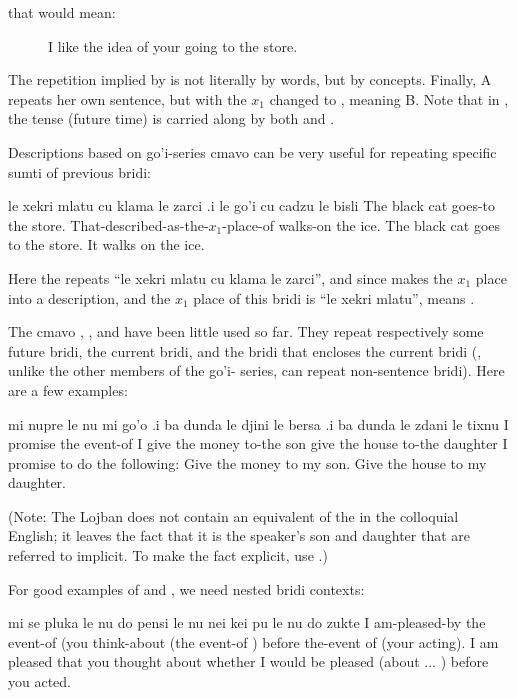 {\noindent}that would mean: 
\begin{description}
\item[] I like the idea of your going to the store.
\end{description}

The repetition implied by  is not literally by words,
    but by concepts. Finally, A repeats her own sentence, but with
    the $x_1$ changed to , meaning B. Note that in , the tense  (future time)
    is carried along by both  and . 

Descriptions based on go'i-series cmavo can be very useful
    for repeating specific sumti of previous bridi:
\begin{example}
le xekri mlatu cu klama le zarci\n
\T	.i le go'i cu\n
\T	cadzu le bisli\n
The black cat goes-to the store.\n
\T	That-described-as-the-$x_1$-place-of \n
\T	walks-on the ice.\n
The black cat goes to the store.  It walks on the ice.
\end{example}

Here the  repeats ``le xekri mlatu cu klama le
    zarci'', and since  makes the $x_1$ place into a
    description, and the $x_1$ place of this bridi is ``le xekri
    mlatu'',  means .

The cmavo , , and  have been little
    used so far. They repeat respectively some future bridi, the
    current bridi, and the bridi that encloses the current bridi
    (, unlike the other members of the go'i- series, can
    repeat non-sentence bridi). Here are a few examples:
\begin{example}
mi nupre le nu mi go'o\n
\T	.i ba dunda le djini le bersa\n
\T	.i ba dunda le zdani le tixnu\n
I promise the event-of I \n
\T	[Future] give the money to-the son\n
\T	[Future] give the house to-the daughter\n
I promise to do the following:\n
\T	Give the money to my son.\n
\T	Give the house to my daughter.
\end{example}

(Note: The Lojban does not contain an equivalent of the 
    in the colloquial English; it leaves the fact that it is the
    speaker's son and daughter that are referred to implicit. To
    make the fact explicit, use .) 

For good examples of  and , we need nested
    bridi contexts:
\begin{example}
mi se pluka le nu do pensi\n
\T	le nu nei kei\n
\T	pu le nu do zukte\n
I am-pleased-by the event-of (you think-about\n
\T	(the event-of )\n
\T	before the-event of (your acting).\n
I am pleased that you thought about whether I\n
\T	would be pleased (about ... ) before you acted.
\end{example}

